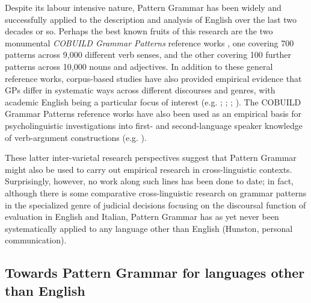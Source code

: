 \documentclass[output=paper]{langscibook}
\begin{document}
Despite its labour intensive nature, Pattern Grammar has been widely and successfully applied to the description and analysis of English over the last two decades or so. Perhaps the best known fruits of this research are the two monumental \textit{COBUILD Grammar Patterns} reference works \citep{FrancisEtAl1996,FrancisEtAl1998}, one covering 700 patterns across 9,000 different verb senses, and the other covering 100 further patterns across 10,000 nouns and adjectives. In addition to these general reference works, corpus-based studies have also provided empirical evidence that GPs differ in systematic ways across different discourses and genres, with academic English being a particular focus of interest (e.g. \citealt{Groom2005}; \citealt{Charles2006, Charles2007}; \citealt{Larsson2016}; \citealt{SuHunston2019}). The COBUILD Grammar Patterns reference works have also been used as an empirical basis for psycholinguistic investigations into first- and second-language speaker knowledge of verb-argument constructions (e.g. \citealt{EllisEtAl2014,RömerEtAl2014,RömerEtAl2015}).

These latter inter-varietal research perspectives suggest that Pattern Grammar might also be used to carry out empirical research in cross-linguistic contexts. Surprisingly, however, no work along such lines has been done to date; in fact, although there is some comparative cross-linguistic research on grammar patterns in the specialized genre of judicial decisions \citep{PontrandolfoGoźdź-Roszkowski2014} focusing on the discoursal function of evaluation in English and Italian, Pattern Grammar has as yet never been systematically applied to any language other than English (Hunston, personal communication).

\subsection{Towards Pattern Grammar for languages other than English}
\end{document}
